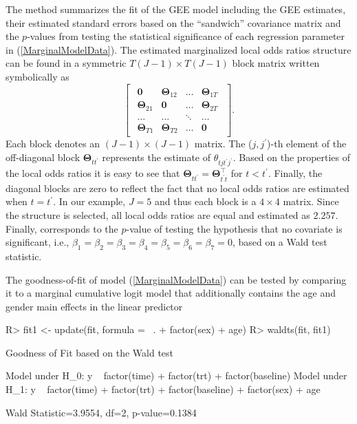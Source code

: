\documentclass[article,shortnames,nojss]{jss}
\begin{document}
The  method summarizes the fit of the GEE model including the GEE estimates, their estimated standard errors based on the ``sandwich'' covariance matrix and the $p$-values from testing the statistical significance of each regression parameter in (\ref{MarginalModelData}). The estimated marginalized local odds ratios structure can be found in a symmetric $T(J-1) \times T(J-1)$ block matrix written symbolically as
$$\begin{bmatrix}
\begin{array}{cccc}
\mathbf 0                               &\boldsymbol{\Theta}_{12}                 &\ldots  &\boldsymbol{\Theta}_{1T} \\
\boldsymbol{\Theta}_{21}       &\mathbf 0                                &\ldots  &\boldsymbol{\Theta}_{2T} \\
\ldots                                  &\ldots                                   &\ddots  & \ldots          \\
\boldsymbol{\Theta}_{T1}       &\boldsymbol{\Theta}_{T2}        &\ldots  &\mathbf 0
\end{array}
\end{bmatrix}.$$
Each block denotes an $(J-1) \times (J-1)$ matrix. The ($j,j^{\prime}$)-th element of the off-diagonal block $\boldsymbol{\Theta}_{tt^{\prime}}$ represents the estimate of $\theta_{tjt^{\prime}j^{\prime}}$. Based on the properties of the local odds ratios it is easy to see that $\boldsymbol{\Theta}_{tt^{\prime}}=\boldsymbol{\Theta}^{\top}_{t^{\prime}t}$ for $t<t^{\prime}$. Finally, the diagonal blocks are zero to reflect the fact that no local odds ratios are estimated when $t=t^{\prime}$. In our example, $J=5$ and thus each block is a $4 \times 4$ matrix. Since the  structure is selected, all local odds ratios are equal and estimated as $2.257$. Finally,  corresponds to the $p$-value of testing the hypothesis that no covariate is significant, i.e., $\beta_1=\beta_2=\beta_3=\beta_4 =\beta_5=\beta_6=\beta_7=0$, based on a Wald test statistic. 

The goodness-of-fit of model (\ref{MarginalModelData}) can be tested by comparing it to a marginal cumulative logit model that additionally contains the age and gender main effects in the linear predictor 
\begin{Schunk}
\begin{Sinput}
R> fit1 <- update(fit, formula = ~. + factor(sex) + age)
R> waldts(fit, fit1)
\end{Sinput}
\begin{Soutput}
Goodness of Fit based on the Wald test 

Model under H_0: y ~ factor(time) + factor(trt) + factor(baseline)
Model under H_1: y ~ factor(time) + factor(trt) + factor(baseline) + factor(sex) + 
    age

Wald Statistic=3.9554, df=2, p-value=0.1384
\end{Soutput}
\end{Schunk}
\end{document}
